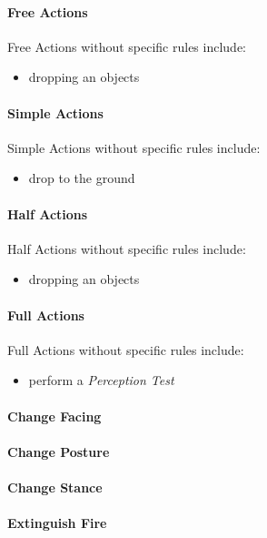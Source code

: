 \paragraph{Free Actions}
Free Actions without specific rules include:
\begin{itemize}[parsep=0em]
    \item dropping an objects
\end{itemize}

\paragraph{Simple Actions}
Simple Actions without specific rules include:
\begin{itemize}[parsep=0em]
    \item drop to the ground
\end{itemize}

\paragraph{Half Actions}
Half Actions without specific rules include:
\begin{itemize}[parsep=0em]
    \item dropping an objects
\end{itemize}

\paragraph{Full Actions}
Full Actions without specific rules include:
\begin{itemize}[parsep=0em]
    \item perform a \emph{Perception Test}
\end{itemize}


\paragraph{Change Facing}

\paragraph{Change Posture}

\paragraph{Change Stance}

\paragraph{Extinguish Fire}

